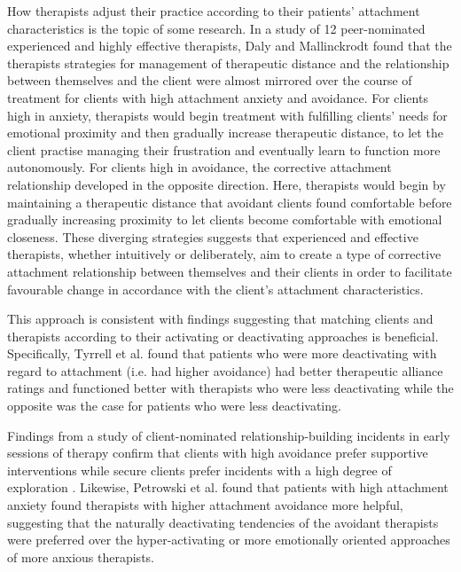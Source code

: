 \documentclass[12pt]{report}
\begin{document}
How therapists adjust their practice according to their patients' attachment characteristics is the topic of some research.
In a study of 12 peer-nominated experienced and highly effective therapists, Daly and Mallinckrodt \citeyear{Daly2009} found that the therapists strategies for management of therapeutic distance and the relationship between themselves and the client were almost mirrored over the course of treatment for clients with high attachment anxiety and avoidance.
For clients high in anxiety, therapists would begin treatment with fulfilling clients' needs for emotional proximity and then gradually increase therapeutic distance, to let the client practise managing their frustration and eventually learn to function more autonomously.
For clients high in avoidance, the corrective attachment relationship developed in the opposite direction. Here, therapists would begin by maintaining a therapeutic distance that avoidant clients found comfortable before gradually increasing proximity to let clients become comfortable with emotional closeness.
These diverging strategies suggests that experienced and effective therapists, whether intuitively or deliberately, aim to create a type of corrective attachment relationship between themselves and their clients in order to facilitate favourable change in accordance with the client's attachment characteristics.

This approach is consistent with findings suggesting that matching clients and therapists according to their activating or deactivating approaches is beneficial.
Specifically, Tyrrell et al. \citeyear{Tyrrell1999} found that patients who were more deactivating with regard to attachment (i.e. had higher avoidance) had better therapeutic alliance ratings and functioned better with therapists who were less deactivating while the opposite was the case for patients who were less deactivating.

Findings from a study of client-nominated relationship-building incidents in early sessions of therapy confirm that clients with high avoidance prefer supportive interventions while secure clients prefer incidents with a high degree of exploration \cite{Janzen2010}.
Likewise, Petrowski et al. \citeyear{Petrowski2011} found that patients with high attachment anxiety found therapists with higher attachment avoidance more helpful, suggesting that the naturally deactivating tendencies of the avoidant therapists were preferred over the hyper-activating or more emotionally oriented approaches of more anxious therapists.
\end{document}
